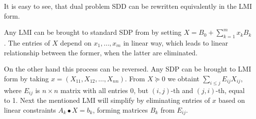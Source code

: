 \documentclass[10pt,oneside]{book}
\theoremstyle{definition}
\begin{document}
It is easy to see, that dual problem SDD can be rewritten equivalently in the LMI form.

Any LMI can be brought to standard SDP from by setting $X = B_0 + \sum_{k=1}^m x_kB_k $. The entries of $X$ depend on $x_1,\dots , x_m$ in linear way, which leads to linear relationship between the former, when the latter are eliminated.

On the other hand this process can be reversed. Any SDP can be brought to LMI form by taking $x = (X_{11},X_{12},\dots , X_{nn})$. From $X\succeq 0$ we obtaint $\sum_{i\leq j} E_{ij}X_{ij}$, where $E_{ij}$ is $n\times n$ matrix with all entries 0, but $(i,j)$-th and $(j,i)$-th, equal to 1.
Next the mentioned LMI will simplify by eliminating entries of $x$ based on linear constraints $A_k\bullet X = b_k$, forming matrices $B_k$ from $E_{ij}$.
\end{document}
